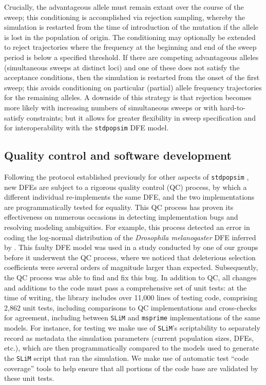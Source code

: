 \documentclass[hidelinks]{article}
\newcommand{\stdpopsim}{\texttt{stdpopsim}\xspace}
\newcommand{\slim}{\texttt{SLiM}\xspace}
\newcommand{\msprime}{\texttt{msprime}\xspace}
\begin{document}
    Crucially, the advantageous allele must remain extant over the course of
    the sweep; this conditioning is accomplished via rejection sampling,
    whereby the simulation is restarted from the time of introduction of the mutation if the
    allele is lost in the population of origin. The conditioning may
    optionally be extended to reject trajectories where the frequency at the
    beginning and end of the sweep period is below a specified threshold. If
    there are competing advantageous alleles (simultaneous sweeps at distinct
    loci) and one of these does not satisfy the acceptance conditions, then the
    simulation is restarted from the onset of the first sweep; this avoids
    conditioning on particular (partial) allele frequency trajectories for the
    remaining alleles.  A downside of this strategy is that rejection becomes
    more likely with increasing numbers of simultaneous sweeps or with
    hard-to-satisfy constraints; but it allows for greater flexibility in sweep
    specification and for interoperability with the \stdpopsim DFE model.
    

    \subsection*{Quality control and software development}
    Following the protocol established previously for other aspects of \stdpopsim{} \citep{adrion2020community},
    new DFEs are subject to a rigorous quality control (QC) process,
    by which a different individual re-implements the same DFE, and the two implementations
    are programmatically tested for equality.
    This QC process has proven its effectiveness on numerous occasions in detecting implementation bugs
    and resolving modeling ambiguities.
    For example, this process detected  an error in coding the log-normal distribution of
    the \textit{Drosophila melanogaster} DFE inferred by \citet[\stdpopsim label \texttt{LognormalPlusPositive\_R16}]{booker2021selective}.
    This faulty DFE model was used in a study conducted by one of our groups before it underwent the QC process,
    where we noticed that deleterious selection coefficients
    were several orders of magnitude larger than expected.
    Subsequently, the QC process was able to find and fix this bug.
    In addition to QC, all changes and additions to the code must pass a comprehensive set of unit tests:
    at the time of writing, the library includes over 11,000 lines of testing code,
    comprising 2,862 unit tests, including comparisons to QC implementations
    and cross-checks for agreement, including between \slim and \msprime implementations of the same models.
    For instance, for testing we make use of \slim's scriptability to separately record as metadata
    the simulation parameters (current population sizes, DFEs, etc.),
    which are then programmatically compared to the models used to generate the \slim script
    that ran the simulation.
    We make use of automatic test ``code coverage'' tools to help ensure that all portions of the code base
    are validated by these unit tests.
\end{document}
